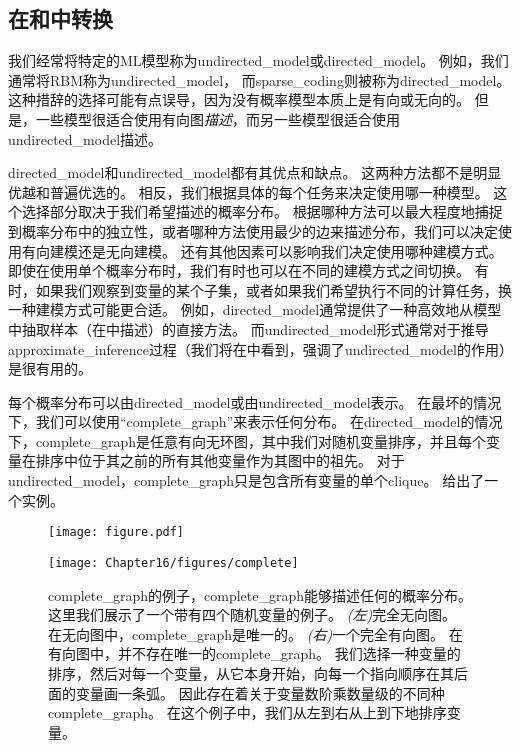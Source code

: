 \subsection{在和中转换}
\label{sec:converting_between_undirected_and_directed_graphs}

我们经常将特定的\gls{ML}模型称为\gls{undirected_model}或\gls{directed_model}。
例如，我们通常将\gls{RBM}称为\gls{undirected_model}， 而\gls{sparse_coding}则被称为\gls{directed_model}。
这种措辞的选择可能有点误导，因为没有概率模型本质上是有向或无向的。
但是，一些模型很适合使用有向图\emph{描述}，而另一些模型很适合使用\gls{undirected_model}描述。

\gls{directed_model}和\gls{undirected_model}都有其优点和缺点。
这两种方法都不是明显优越和普遍优选的。
相反，我们根据具体的每个任务来决定使用哪一种模型。 
这个选择部分取决于我们希望描述的概率分布。
根据哪种方法可以最大程度地捕捉到概率分布中的独立性，或者哪种方法使用最少的边来描述分布，我们可以决定使用有向建模还是无向建模。
还有其他因素可以影响我们决定使用哪种建模方式。 
即使在使用单个概率分布时，我们有时也可以在不同的建模方式之间切换。
有时，如果我们观察到变量的某个子集，或者如果我们希望执行不同的计算任务，换一种建模方式可能更合适。
例如，\gls{directed_model}通常提供了一种高效地从模型中抽取样本（在中描述）的直接方法。
而\gls{undirected_model}形式通常对于推导\gls{approximate_inference}过程（我们将在中看到，强调了\gls{undirected_model}的作用）是很有用的。


每个概率分布可以由\gls{directed_model}或由\gls{undirected_model}表示。
在最坏的情况下，我们可以使用``\gls{complete_graph}''来表示任何分布。
在\gls{directed_model}的情况下，\gls{complete_graph}是任意有向无环图，其中我们对随机变量排序，并且每个变量在排序中位于其之前的所有其他变量作为其图中的祖先。
对于\gls{undirected_model}，\gls{complete_graph}只是包含所有变量的单个\gls{clique}。 
给出了一个实例。

\begin{figure}[!htb]
\ifOpenSource
\centerline{\texttt{[image: figure.pdf]}}
\else
	\centerline{\texttt{[image: Chapter16/figures/complete]}}	
\fi
\caption{\gls{complete_graph}的例子，\gls{complete_graph}能够描述任何的概率分布。
这里我们展示了一个带有四个随机变量的例子。
\emph{(左)}完全无向图。
在无向图中，\gls{complete_graph}是唯一的。
\emph{(右)}一个完全有向图。
在有向图中，并不存在唯一的\gls{complete_graph}。
我们选择一种变量的排序，然后对每一个变量，从它本身开始，向每一个指向顺序在其后面的变量画一条弧。
因此存在着关于变量数阶乘数量级的不同种\gls{complete_graph}。
在这个例子中，我们从左到右从上到下地排序变量。}
	\label{fig:complete}
\end{figure}


